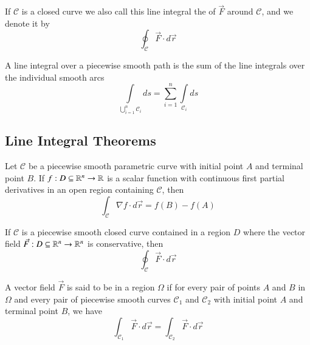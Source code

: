 \documentclass[12pt, a4paper, oneside, openright, titlepage]{book}
\begin{document}
\begin{appendices}
    \begin{defn}
        If $\mathcal{C}$ is a closed curve we also call this line integral the  of $\vec{F}$ around $\mathcal{C}$, and we denote it by \begin{equation}
            \oint_{\mathcal{C}}\vec{F} \cdot d\vec{r}
        \end{equation}
    \end{defn}
    
    \begin{rmk}
        A line integral over a piecewise smooth path is the sum of the line integrals over the individual smooth arcs \begin{equation}
            \int\limits_{\bigcup_{i=1}^n\mathcal{C}_i}ds = \sum\limits_{i=1}^n\int\limits_{\mathcal{C}_i}ds
        \end{equation}
    \end{rmk}
    
    \subsection{Line Integral Theorems}
    
    \begin{namthm}
        Let $\mathcal{C}$ be a piecewise smooth parametric curve with initial point $A$ and terminal point $B$. If $f:D \subseteq \mathbb R^n \rightarrow \mathbb R$ is a scalar function with continuous first partial derivatives in an open region containing $\mathcal{C}$, then \begin{equation}
            \int_{\mathcal{C}}\nabla f\cdot d\vec{r} = f(B) - f(A)
        \end{equation} 
    \end{namthm}
    
    \begin{cor}
        If $\mathcal{C}$ is a piecewise smooth closed curve contained in a region $D$ where the vector field $\vec{F}:D\subseteq \mathbb R^n\rightarrow \mathbb R^n$ is conservative, then \begin{equation}
            \oint_{\mathcal{C}}\vec{F}\cdot d\vec{r}
        \end{equation}
    \end{cor}
    
    \begin{defn}
        A vector field $\vec{F}$ is said to be  in a region $\Omega$ if for every pair of points $A$ and $B$ in $\Omega$ and every pair of piecewise smooth curves $\mathcal{C}_1$ and $\mathcal{C}_2$ with initial point $A$ and terminal point $B$, we have \begin{equation}
            \int_{\mathcal{C}_1}\vec{F}\cdot d\vec{r} = \int_{\mathcal{C}_2}\vec{F}\cdot d\vec{r}
        \end{equation}
    \end{defn}
    

\end{appendices}
\end{document}
